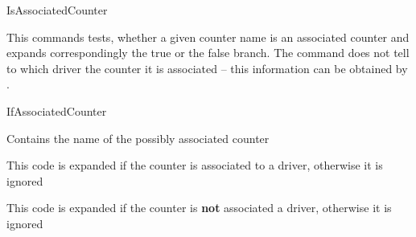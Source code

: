 \documentclass[12pt,a4paper,oneside]{article}
\begin{document}
\begin{docCommand}{IsAssociatedCounter}{}%

This commands tests, whether a given counter name is an associated counter and expands correspondingly the true or the false branch. The command does not tell to which driver the counter it is associated -- this information can be obtained by . 

\begin{docCommandArgs}{IfAssociatedCounter}%

\begin{codeoptionsenum}
\item {}%

  Contains the name of the possibly associated counter

\item {}

  This code is expanded if the counter is associated to a driver, otherwise it is ignored

\item {}

  This code is expanded if the counter is \textbf{not} associated a  driver, otherwise it is ignored

\end{codeoptionsenum}
\end{docCommandArgs}


\begin{dispExample}
\end{dispExample}

\end{docCommand}%
\end{document}
